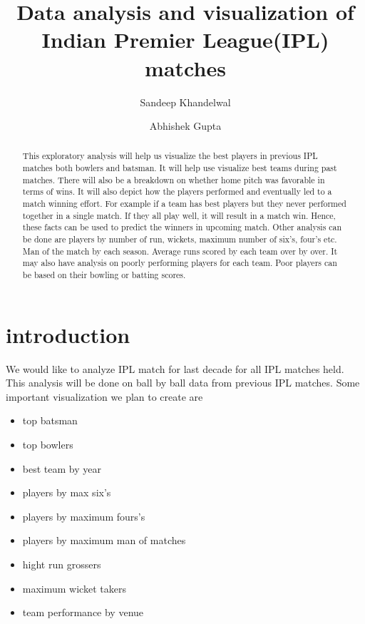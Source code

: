 \documentclass[sigconf]{acmart}
\begin{document}
\title{Data analysis and visualization of Indian Premier League(IPL) matches}

\author{Sandeep Khandelwal}

\author{Abhishek Gupta}

\begin{abstract}

This exploratory analysis will help us visualize the best players in previous
IPL matches both bowlers and batsman. It will help use visualize best 
teams during past matches. There will also be a breakdown on whether
home pitch was favorable in terms of wins. It will also depict how the players 
performed and eventually led to a match winning effort. For example if 
a team has best players but they never performed together in a single match.
If they all play well, it will result in a match win. Hence, these facts can be used to
predict the winners in upcoming match. Other analysis can be done are players by
number of run, wickets, maximum number of six's, four's etc. Man of the match
by each season. Average runs scored by each team over by over. It may also
have analysis on poorly performing players for each team. Poor players 
can be based on their bowling or batting scores. 
   
\end{abstract}


\maketitle

\section{introduction}
We would like to analyze IPL match for last decade for all IPL matches held. This analysis
will be done on ball by ball data from previous IPL matches. Some important visualization
we plan to create are
\begin {itemize}
\item top batsman
\item top bowlers
\item best team by year
\item players by max six's
\item players by maximum fours's
\item players by maximum man of matches
\item hight run grossers
\item maximum wicket takers
\item team performance by venue 
\end {itemize}
\end{document}
